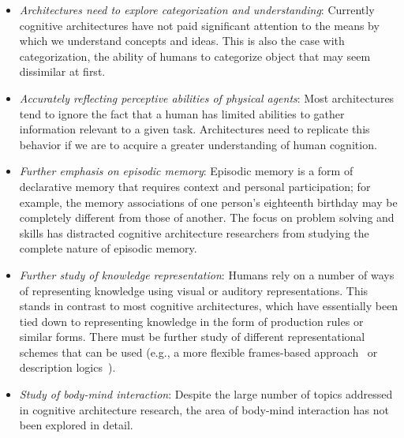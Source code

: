 \begin{itemize}
\item \emph{Architectures need to explore categorization and
    understanding}: Currently cognitive architectures have not paid
  significant attention to the means by which we understand concepts
  and ideas. This is also the case with categorization, the ability of
  humans to categorize object that may seem dissimilar at first.
  
\item \emph{Accurately reflecting perceptive abilities of physical
    agents}: Most architectures tend to ignore the fact that a human
  has limited abilities to gather information relevant to a given
  task. Architectures need to replicate this behavior if we are to
  acquire a greater understanding of human cognition.

\item \emph{Further emphasis on episodic memory}: Episodic memory is a
  form of declarative memory that requires context and personal
  participation\cite{09011999}; for example, the memory associations
  of one person's eighteenth birthday may be completely different from
  those of another.  The focus on problem solving and skills has
  distracted cognitive architecture researchers from studying the
  complete nature of episodic memory.

\item \emph{Further study of knowledge representation}: Humans rely on
  a number of ways of representing knowledge using visual or auditory
  representations.  This stands in contrast to most cognitive
  architectures, which have essentially been tied down to representing
  knowledge in the form of production rules or similar forms. There
  must be further study of different representational schemes that can
  be used (e.g., a more flexible frames-based
  approach~\cite{Minsky1974a} or description
  logics~\cite{nardi-brachman:2003a}).

\item \emph{Study of body-mind interaction}: Despite the large number
  of topics addressed in cognitive architecture research, the area of
  body-mind interaction has not been explored in detail.



\end{itemize}
